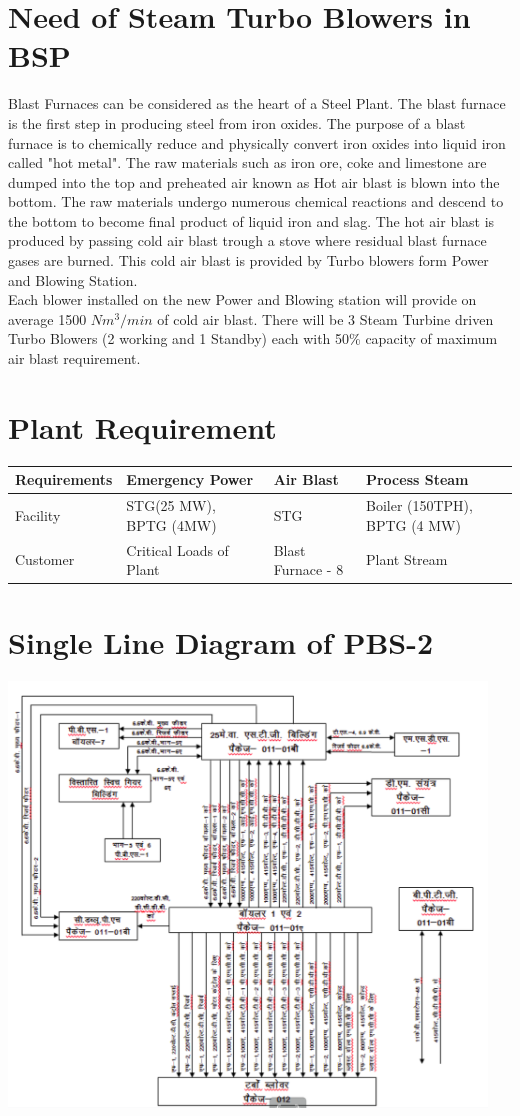 \documentclass[english,11pt]{report}
\begin{document}
\section{Need of Steam Turbo Blowers in BSP}
Blast Furnaces can be considered as the heart of a Steel Plant. The blast furnace is the first step in producing steel from iron oxides. The purpose of a blast furnace is to chemically reduce and physically convert iron oxides into liquid iron called "hot metal". The raw materials such as iron ore, coke and limestone are dumped into the top and preheated air known as Hot air blast is blown into the bottom. The raw materials undergo numerous chemical reactions and descend to the bottom to become final product of liquid iron and slag. The hot air blast is produced by passing cold air blast trough a stove where residual blast furnace gases are burned. This cold air blast is provided by Turbo blowers form Power and Blowing Station. \\
Each blower installed on the new Power and Blowing station will provide on average 1500 $Nm^{3}/min$ of cold air blast. There will be 3 Steam Turbine driven Turbo Blowers (2 working and 1 Standby) each with 50\% capacity of maximum air blast requirement.\\
\section{Plant Requirement}
\begin{tabular}{|p{3cm}|p{3cm}|p{3cm}|p{3cm}|}
\hline
    \textbf{Requirements} & \textbf{Emergency Power} & \textbf{Air Blast} & \textbf{Process Steam}\\ \hline
    Facility & STG(25 MW), BPTG (4MW) & STG & Boiler (150TPH), BPTG (4 MW)\\ \hline
    Customer & Critical Loads of Plant & Blast Furnace - 8 & Plant Stream \\ \hline
\end{tabular}
\section{Single Line Diagram of PBS-2}
\includegraphics[width = 5in]{sldpbs2.png}
\end{document}
